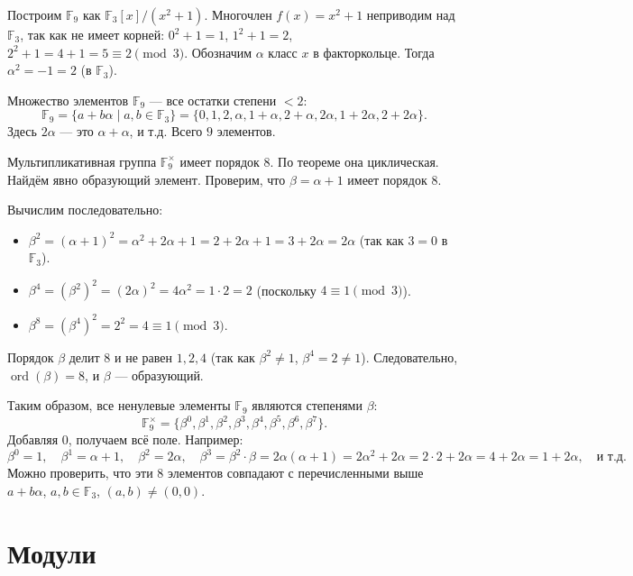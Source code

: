 \documentclass[10pt]{article}
\begin{document}
\begin{example}
    Построим $\mathbb{F}_9$ как $\mathbb{F}_3[x]/(x^2+1)$. Многочлен $f(x)=x^2+1$ неприводим над $\mathbb{F}_3$, так как не имеет корней: $0^2+1=1$, $1^2+1=2$, $2^2+1=4+1=5\equiv2 \pmod{3}$. Обозначим $\alpha$ класс $x$ в факторкольце. Тогда $\alpha^2 = -1 = 2$ (в $\mathbb{F}_3$).

Множество элементов $\mathbb{F}_9$ — все остатки степени $<2$:
\[
\mathbb{F}_9 = \{ a + b\alpha \mid a,b \in \mathbb{F}_3 \} = \{0,1,2,\alpha,1+\alpha,2+\alpha,2\alpha,1+2\alpha,2+2\alpha\}.
\]
Здесь $2\alpha$ — это $\alpha+\alpha$, и т.д. Всего $9$ элементов.

Мультипликативная группа $\mathbb{F}_9^{\times}$ имеет порядок $8$. По теореме она циклическая. Найдём явно образующий элемент. Проверим, что $\beta = \alpha+1$ имеет порядок $8$.

Вычислим последовательно:
\begin{itemize}
    \item $\beta^2 = (\alpha+1)^2 = \alpha^2 + 2\alpha + 1 = 2 + 2\alpha + 1 = 3 + 2\alpha = 2\alpha$ (так как $3=0$ в $\mathbb{F}_3$).
    \item $\beta^4 = (\beta^2)^2 = (2\alpha)^2 = 4\alpha^2 = 1 \cdot 2 = 2$ (поскольку $4\equiv1\pmod{3}$).
    \item $\beta^8 = (\beta^4)^2 = 2^2 = 4 \equiv 1 \pmod{3}$.
\end{itemize}
Порядок $\beta$ делит $8$ и не равен $1,2,4$ (так как $\beta^2 \neq 1$, $\beta^4 = 2 \neq 1$). Следовательно, $\operatorname{ord}(\beta)=8$, и $\beta$ — образующий.

Таким образом, все ненулевые элементы $\mathbb{F}_9$ являются степенями $\beta$:
\[
\mathbb{F}_9^{\times} = \{ \beta^0, \beta^1, \beta^2, \beta^3, \beta^4, \beta^5, \beta^6, \beta^7 \}.
\]
Добавляя $0$, получаем всё поле. Например:
\[
\beta^0 = 1,\quad \beta^1 = \alpha+1,\quad \beta^2 = 2\alpha,\quad \beta^3 = \beta^2\cdot\beta = 2\alpha(\alpha+1)=2\alpha^2+2\alpha = 2\cdot2 + 2\alpha = 4+2\alpha = 1+2\alpha,\quad \text{и т.д.}
\]
Можно проверить, что эти $8$ элементов совпадают с перечисленными выше $a+b\alpha$, $a,b\in\mathbb{F}_3$, $(a,b)\neq(0,0)$.
\end{example}

\section{Модули}
\end{document}
